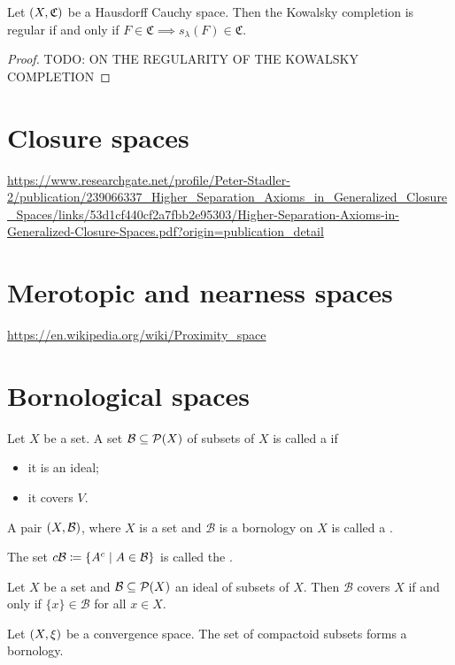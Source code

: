 \begin{proposition}
Let $\sSet{X, \mathfrak{C}}$ be a Hausdorff Cauchy space. Then the Kowalsky completion is regular \textup{if and only if} $F\in \mathfrak{C} \implies s_\lambda(F) \in \mathfrak{C}$.
\end{proposition}
\begin{proof}
TODO: ON THE REGULARITY OF THE KOWALSKY
COMPLETION
\end{proof}

\section{Closure spaces}
\url{https://www.researchgate.net/profile/Peter-Stadler-2/publication/239066337_Higher_Separation_Axioms_in_Generalized_Closure_Spaces/links/53d1cf440cf2a7fbb2e95303/Higher-Separation-Axioms-in-Generalized-Closure-Spaces.pdf?origin=publication_detail}

\section{Merotopic and nearness spaces}
\url{https://en.wikipedia.org/wiki/Proximity_space}

\section{Bornological spaces}
\begin{definition}
Let $X$ be a set. A set $\mathcal{B}\subseteq \operatorname{\mathcal{P}}(X)$ of subsets of $X$ is called a  if
\begin{itemize}
\item it is an ideal;
\item it covers $V$.
\end{itemize}
A pair $\sSet{X,\mathcal{B}}$, where $X$ is a set and $\mathcal{B}$ is a bornology on $X$ is called a .

The set $c\mathcal{B}\defeq \setbuilder{A^c}{A\in\mathcal{B}}$ is called the .
\end{definition}

\begin{lemma} \label{bornologyCoveringLemma}
Let $X$ be a set and $\mathcal{B}\subseteq \operatorname{\mathcal{P}}(X)$ an ideal of subsets of $X$. Then $\mathcal{B}$ covers $X$ \textup{if and only if} $\{x\}\in \mathcal{B}$ for all $x\in X$.
\end{lemma}

\begin{example}
Let $\sSet{X,\xi}$ be a convergence space. The set of compactoid subsets forms a bornology.
\end{example}

